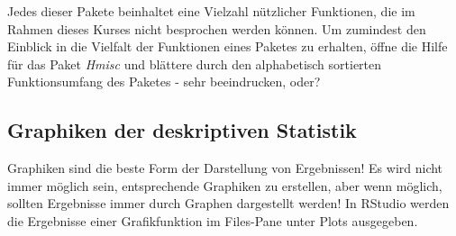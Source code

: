 \documentclass[]{article}
\newenvironment{Shaded}{\begin{snugshade}}{\end{snugshade}}
\newcommand{\KeywordTok}[1]{\textcolor[rgb]{0.13,0.29,0.53}{\textbf{#1}}}
\newcommand{\DataTypeTok}[1]{\textcolor[rgb]{0.13,0.29,0.53}{#1}}
\newcommand{\StringTok}[1]{\textcolor[rgb]{0.31,0.60,0.02}{#1}}
\newcommand{\ControlFlowTok}[1]{\textcolor[rgb]{0.13,0.29,0.53}{\textbf{#1}}}
\newcommand{\OperatorTok}[1]{\textcolor[rgb]{0.81,0.36,0.00}{\textbf{#1}}}
\newcommand{\NormalTok}[1]{#1}
\begin{document}
\begin{Shaded}
\end{Shaded}

Jedes dieser Pakete beinhaltet eine Vielzahl nützlicher Funktionen, die
im Rahmen dieses Kurses nicht besprochen werden können. Um zumindest den
Einblick in die Vielfalt der Funktionen eines Paketes zu erhalten, öffne
die Hilfe für das Paket \emph{Hmisc} und blättere durch den alphabetisch
sortierten Funktionsumfang des Paketes - sehr beeindrucken, oder?

\subsection*{Graphiken der deskriptiven
Statistik}\label{graphiken-der-deskriptiven-statistik}

Graphiken sind die beste Form der Darstellung von Ergebnissen! Es wird
nicht immer möglich sein, entsprechende Graphiken zu erstellen, aber
wenn möglich, sollten Ergebnisse immer durch Graphen dargestellt werden!
In RStudio werden die Ergebnisse einer Grafikfunktion im Files-Pane
unter Plots ausgegeben.
\end{document}
